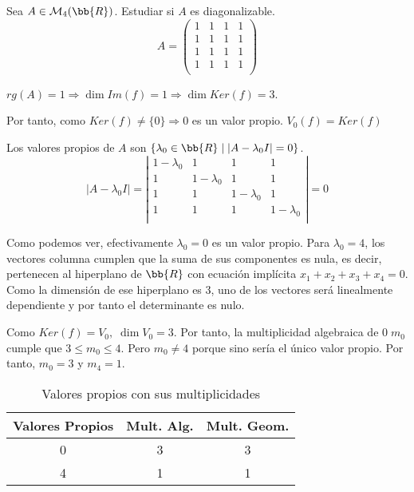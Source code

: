 \begin{ejercicio}
    Sea $A\in \mathcal{M}_4(\bb{R})$. Estudiar si $A$ es diagonalizable.
    \begin{equation*}
        A = \left( \begin{array}{cccc}
            1 & 1 & 1 & 1 \\
            1 & 1 & 1 & 1 \\
            1 & 1 & 1 & 1 \\
            1 & 1 & 1 & 1 \\
        \end{array}\right)
    \end{equation*}

    $rg(A)=1 \Longrightarrow \dim Im(f) = 1 \Longrightarrow \dim Ker(f)=3$.
    
    Por tanto, como $Ker(f)\neq\{0\}\Longrightarrow 0$  es un valor propio. $V_0(f)=Ker(f)$

    Los valores propios de $A$ son $\{\lambda_0 \in \bb{R} \mid |A-\lambda_0 I| = 0\}$.
    \begin{equation*}
        |A-\lambda_0 I| = \left| \begin{array}{cccc}
            1-\lambda_0 & 1 & 1 & 1 \\
            1 & 1-\lambda_0 & 1 & 1 \\
            1 & 1 & 1-\lambda_0 & 1 \\
            1 & 1 & 1 & 1-\lambda_0 \\
        \end{array}\right| = 0
    \end{equation*}

    Como podemos ver, efectivamente $\lambda_0 = 0$ es un valor propio. Para $\lambda_0=4$, los vectores columna cumplen que la suma de sus componentes es nula, es decir, pertenecen al hiperplano de $\bb{R}$ con ecuación implícita $x_1+x_2+x_3+x_4 = 0$. Como la dimensión de ese hiperplano es $3$, uno de los vectores será linealmente dependiente y por tanto el determinante es nulo.

    Como $Ker(f) = V_0,\;\dim V_0 = 3$. Por tanto, la multiplicidad algebraica de $0\;m_0$ cumple que $3 \leq m_0 \leq 4$. Pero $m_0\neq 4$ porque sino sería el único valor propio. Por tanto, $m_0=3$ y $m_4=1$.
    
    
    \begin{table}[H]
        \centering
        \begin{tabular}{c|c|c}
            Valores Propios & Mult. Alg. & Mult. Geom. \\ \hline 
            0 & 3 & 3\\
            4 & 1 & 1\\
        \end{tabular}
        \caption{Valores propios con sus multiplicidades}
    \end{table}


\end{ejercicio}
